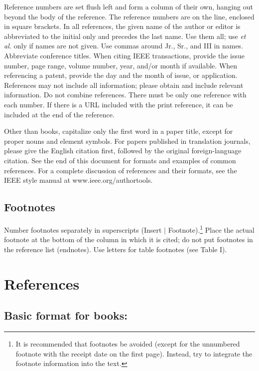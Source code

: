 Reference numbers are set flush left and form a column of their own, hanging out beyond the body of the reference. The reference numbers are on the line, enclosed in square brackets. In all references, the given name of the author or editor is abbreviated to the initial only and precedes the last name. Use them all; use {\em et al.} only if names are not given. Use commas around Jr., Sr., and III in names. Abbreviate conference titles.  When citing IEEE transactions, provide the issue number, page range, volume number, year, and/or month if available. When referencing a patent, provide the day and the month of issue, or application. References may not include all information; please obtain and include relevant information. Do not combine references. There must be only one reference with each number. If there is a URL included with the print reference, it can be included at the end of the reference.

Other than books, capitalize only the first word in a paper title, except for proper nouns and element symbols. For papers published in translation journals, please give the English citation first, followed by the original foreign-language citation. See the end of this document for formats and examples of common references. For a complete discussion of references and their formats, see the IEEE style manual at www.ieee.org/authortools.

\subsection{Footnotes}

Number footnotes separately in superscripts (Insert $\mid$ Footnote).\footnote{It is recommended that footnotes be avoided (except for the unnumbered footnote with the receipt date on the first page). Instead, try to integrate the footnote information into the text.}  Place the actual footnote at the bottom of the column in which it is cited; do not put footnotes in the reference list (endnotes). Use letters for table footnotes (see Table I). 


\section*{References}

\subsection*{Basic format for books:}

